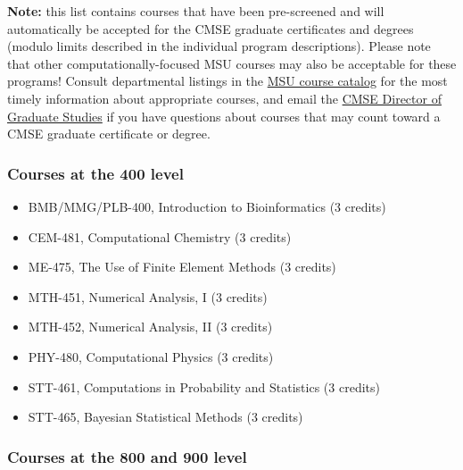 \textbf{Note:} this list contains courses that have been pre-screened
and will automatically be accepted for the CMSE graduate certificates
and degrees (modulo limits described in the individual program
descriptions).  Please note that other computationally-focused MSU
courses may also be acceptable for these programs!  Consult
departmental listings in the
\href{http://reg.msu.edu/Courses}{MSU course catalog}  for the most
timely information about appropriate courses, and email the
\href{mailto:cmsegrad@msu.edu}{CMSE Director of Graduate Studies} if
you have questions about courses that may count toward a CMSE graduate
certificate or degree.

\vspace{3mm}

\subsubsection{Courses at the 400 level}

\begin{itemize}
\item BMB/MMG/PLB-400, Introduction to Bioinformatics (3 credits)  
\item CEM-481, Computational Chemistry (3 credits)  
\item ME-475, The Use of Finite Element Methods (3 credits)  
\item MTH-451, Numerical Analysis, I (3 credits)  
\item MTH-452, Numerical Analysis, II (3 credits)  
\item PHY-480, Computational Physics (3 credits)  
\item STT-461, Computations in Probability and Statistics (3 credits)  
\item STT-465, Bayesian Statistical Methods (3 credits)  
\end{itemize}

\vspace{3mm}

\subsubsection{Courses at the 800 and 900 level}

